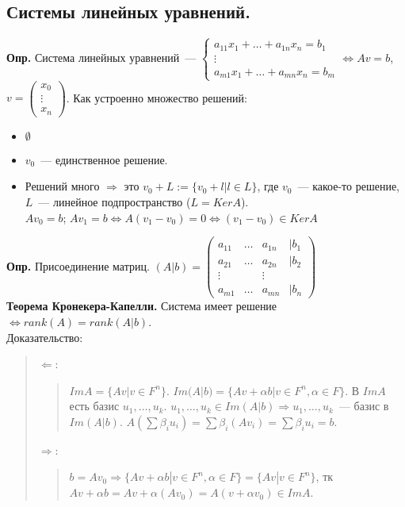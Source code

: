 \documentclass{article}
\begin{document}
	\subsection{Системы линейных уравнений.}
	\textbf{Опр.} Система линейных уравнений~--- $
	\begin{cases}
		a_{11}x_1 + \dots + a_{1n}x_n = b_1 \\
		\vdots \\
		a_{m1}x_1 + \dots + a_{mn}x_n = b_m
	\end{cases}
	\Leftrightarrow Av = b$, $v =
	\left( \begin{smallmatrix}
		x_0 \\
		\vdots \\
		x_n
	\end{smallmatrix} \right)
	$. Как устроенно множество решений:
	\begin{itemize}
		\item $\emptyset$
		\item $v_0$~--- единственное решение.
		\item Решений много $\Rightarrow$ это $v_0 + L := \{ v_0 + l | l \in L \}$, где $v_0$~--- какое-то решение, $L$~--- линейное подпространство ($L = Ker A$). \\
		$Av_0 = b$; $Av_1 = b \Leftrightarrow A(v_1 - v_0) = 0 \Leftrightarrow (v_1 - v_0) \in Ker A$
	\end{itemize}
	\textbf{Опр.} Присоединение матриц. $(A | b) = 
	\left( \begin{smallmatrix}
		a_{11} & \dots & a_{1n} & | b_1 \\
		a_{21} & \dots & a_{2n} & | b_2 \\
		\vdots &  & \vdots \\
		a_{m1} & \dots & a_{mn} & | b_n
	\end{smallmatrix} \right)
	$ \\
	\textbf{Теорема Кронекера-Капелли.} Система имеет решение $\Leftrightarrow rank(A) = rank(A|b)$. \\
	Доказательство:
	\begin{quote}
		$\Leftarrow$:
		\begin{quote}
			$ImA = \{ Av | v \in F^n \}$. $Im(A | b) = \{ Av + \alpha b | v \in F^n, \alpha \in F \}$. В $ImA$ есть базис $u_1, \dots, u_k$. $u_1, \dots, u_k \in Im(A | b) \Rightarrow u_1, \dots, u_k$~--- базис в $Im(A | b)$. $A(\sum \beta_i u_i) = \sum \beta_i (Av_i) = \sum \beta_i u_i = b$.
		\end{quote}
		$\Rightarrow$:
		\begin{quote}
			$b = Av_0 \Rightarrow \{ Av + \alpha b | v \in F^n, \alpha \in F \} = \{ Av | v \in F^n \}$, тк $Av + \alpha b = Av + \alpha (Av_0) = A(v + \alpha v_0) \in ImA$.
		\end{quote}
	\end{quote}
\end{document}
